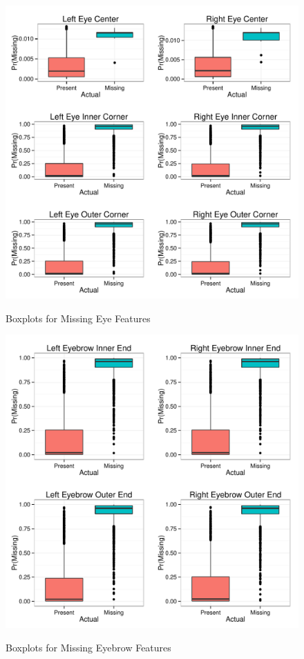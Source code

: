 \documentclass[journal]{IEEEtran}
\begin{document}
\begin{figure}[!ht]
  \centering
  \caption{Boxplots for Missing Eye Features}
  \includegraphics[scale=.49]{logistic_boxplots_eye.pdf}
  \label{fig:logistic_boxplots_eye}
\end{figure}

\begin{figure}[!ht]
  \centering
  \caption{Boxplots for Missing Eyebrow Features}
  \includegraphics[scale=.49]{logistic_boxplots_eyebrow.pdf}
  \label{fig:logistic_boxplots_eyebrow}
\end{figure}
\end{document}
